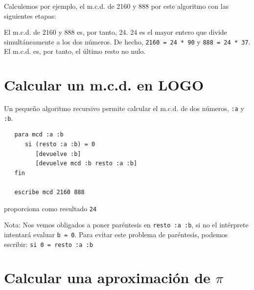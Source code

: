 \documentclass[12pt,twoside,spanish,a4paper]{report}
\begin{document}
Calculemos por ejemplo, el m.c.d. de 2160 y 888 por este algoritmo
con las siguientes etapas:
\begin{center} \end{center}
El m.c.d. de 2160 y 888 es, por tanto, 24. 24 es el mayor entero que
divide simult\'aneamente a los dos n\'umeros. De hecho, 
\texttt{2160 = 24 * 90} y \texttt{888 = 24 * 37}. El m.c.d. es, por tanto,
el \'ultimo resto no nulo.

\section{Calcular un m.c.d. en L{\small{OGO}}}
   \label{sub:m.c.d.-en-logo}

Un peque\~no algoritmo recursivo permite calcular el m.c.d. de dos n\'umeros,
\texttt{:a} y \texttt{:b}.
\begin{verbatim}
   para mcd :a :b
      si (resto :a :b) = 0
         [devuelve :b]
         [devuelve mcd :b resto :a :b]
   fin

   escribe mcd 2160 888\end{verbatim}
\noindent proporciona como resultado \texttt{24}

Nota: Nos vemos obligados a poner par\'entesis en \texttt{resto :a :b},
si no el int\'erprete intentar\'a evaluar \texttt{b = 0}. Para evitar este
problema de par\'entesis, podemos escribir: \texttt{si 0 = resto :a :b}

\section{Calcular una aproximaci\'on de $\pi$}
   \label{sub:Aproximacion-pi}
\end{document}
